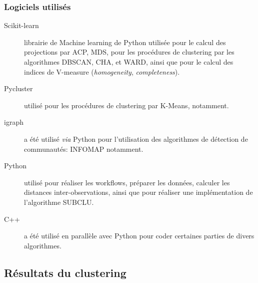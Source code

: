 \subsubsection{Logiciels utilisés}
 \begin{description}
 \item[Scikit-learn] librairie de Machine learning de Python utilisée pour le calcul des projections par ACP, MDS, pour les procédures de clustering par les algorithmes DBSCAN, CHA, et WARD, ainsi que pour le calcul des indices de V-measure (\textit{homogeneity}, \textit{completeness}).
 \item[Pycluster] \citep{de2004open}  utilisé pour les procédures de clustering par K-Means, notamment.
 \item[igraph] \citep{csardi2006igraph} a été utilisé \textit{via} Python pour l'utilisation des algorithmes de détection de communautés: INFOMAP notamment.
 \item[Python]  utilisé pour réaliser les workflows, préparer les données, calculer les distances inter-observations, ainsi que pour réaliser une implémentation de l'algorithme SUBCLU.
 \item[C++] a été utilisé en parallèle avec Python pour coder certaines parties de divers algorithmes. 
 \end{description}

      \subsection{Résultats du clustering}\label{parresultatclustering}
      
